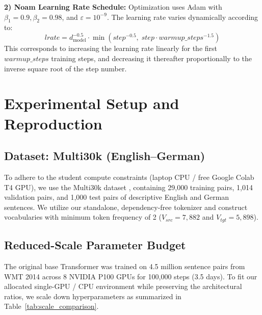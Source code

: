 \documentclass[conference]{IEEEtran}
\begin{document}
\textbf{2) Noam Learning Rate Schedule:} Optimization uses Adam with $\beta_1 = 0.9, \beta_2 = 0.98$, and $\varepsilon = 10^{-9}$. The learning rate varies dynamically according to:
\begin{equation}
lrate = d_{\text{model}}^{-0.5} \cdot \min\left(step^{-0.5}, \; step \cdot warmup\_steps^{-1.5}\right)
\label{eq:noam}
\end{equation}
This corresponds to increasing the learning rate linearly for the first $warmup\_steps$ training steps, and decreasing it thereafter proportionally to the inverse square root of the step number.

\section{Experimental Setup and Reproduction}

\subsection{Dataset: Multi30k (English--German)}
To adhere to the student compute constraints (laptop CPU / free Google Colab T4 GPU), we use the Multi30k dataset \cite{elliott2016multi30k}, containing 29,000 training pairs, 1,014 validation pairs, and 1,000 test pairs of descriptive English and German sentences. We utilize our standalone, dependency-free tokenizer and construct vocabularies with minimum token frequency of 2 ($V_{src} = 7,882$ and $V_{tgt} = 5,898$).

\subsection{Reduced-Scale Parameter Budget}
The original base Transformer was trained on 4.5 million sentence pairs from WMT 2014 across 8 NVIDIA P100 GPUs for 100,000 steps (3.5 days). To fit our allocated single-GPU / CPU environment while preserving the architectural ratios, we scale down hyperparameters as summarized in Table~\ref{tab:scale_comparison}.
\end{document}

